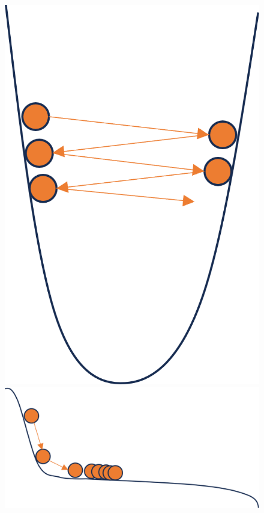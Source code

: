 \documentclass[a4paper,11pt]{jsreport}
\begin{document}
\begin{figure}[htbp]
  \begin{minipage}[b]{0.3\linewidth}
    \centering
    \includegraphics[keepaspectratio, scale=0.5]{image/勾配法課題(a)}
    \subcaption{}
  \end{minipage}
  \begin{minipage}[b]{0.3\linewidth}
    \centering
    \includegraphics[keepaspectratio, scale=0.5]{image/勾配法課題(b)}

\end{minipage}
\end{figure}
\end{document}
